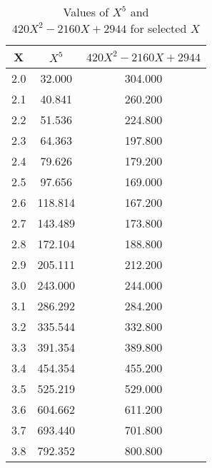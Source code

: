 ﻿%
\begin{table}[h!]
    \centering
    \caption{Values of $X^5$ and $420X^2 - 2160X + 2944$ for selected $X$}
    \begin{tabular}{|c|c|c|}
        \hline
        \textbf{X} & \textbf{$X^5$} & \textbf{$420X^2 - 2160X + 2944$} \\ \hline
        2.0        & 32.000         & 304.000                          \\ \hline
        2.1        & 40.841         & 260.200                          \\ \hline
        2.2        & 51.536         & 224.800                          \\ \hline
        2.3        & 64.363         & 197.800                          \\ \hline
        2.4        & 79.626         & 179.200                          \\ \hline
        2.5        & 97.656         & 169.000                          \\ \hline
        2.6        & 118.814        & 167.200                          \\ \hline
        2.7        & 143.489        & 173.800                          \\ \hline
        2.8        & 172.104        & 188.800                          \\ \hline
        2.9        & 205.111        & 212.200                          \\ \hline
        3.0        & 243.000        & 244.000                          \\ \hline
        3.1        & 286.292        & 284.200                          \\ \hline
        3.2        & 335.544        & 332.800                          \\ \hline
        3.3        & 391.354        & 389.800                          \\ \hline
        3.4        & 454.354        & 455.200                          \\ \hline
        3.5        & 525.219        & 529.000                          \\ \hline
        3.6        & 604.662        & 611.200                          \\ \hline
        3.7        & 693.440        & 701.800                          \\ \hline
        3.8        & 792.352        & 800.800                          \\ \hline

\end{tabular}
\end{table}
